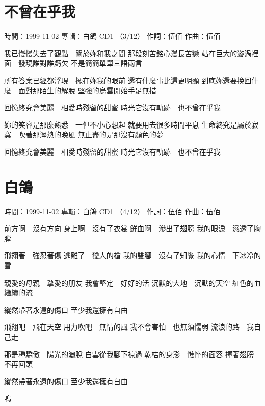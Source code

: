 \documentclass[UTF8,a4paper,oneside,twocolumn,12pt]{ctexbook}
\newcommand{\infopair}[2]{\textbullet #1：#2}
\newcommand{\zc}[1][伍佰]{\infopair{作詞}{#1}}
\newcommand{\zq}[1][伍佰]{\infopair{作曲}{#1}}
\newcommand{\zj}[1]{\infopair{專輯}{#1}}
\newcommand{\sj}[1]{\infopair{時間}{#1}}
\newenvironment{info}{\begin{flushleft}\kaishu
	}
	{\end{flushleft}\normalsize\yahei\par}
\newenvironment{lyric}{
	}
{}
\begin{document}
\section{不曾在乎我}
\begin{info}
	\sj{1999-11-02}
	\zj{白鴿 CD1 （3/12）}
	\zc
	\zq
\end{info}
\begin{lyric}
	我已慢慢失去了觀點　關於妳和我之間
	那段刻苦銘心漫長苦戀
	站在巨大的漩渦裡面　發現誰對誰虧欠
	不是簡簡單單三語兩言

	所有答案已經都浮現　擺在妳我的眼前
	還有什麼事比這更明顯
	到底妳還要挽回什麼　面對那陌生的解脫
	堅強的烏雲開始手足無措

	回憶終究會美麗　相愛時殘留的甜蜜
	時光它沒有軌跡　也不曾在乎我

	妳的笑容是那麼熟悉　一但不小心想起
	就要用去很多時間平息
	生命終究是屬於寂寞　吹著那溼熱的晚風
	無止盡的是那沒有顏色的夢

	回憶終究會美麗　相愛時殘留的甜蜜
	時光它沒有軌跡　也不曾在乎我
\end{lyric}

\section{白鴿}
\begin{info}
	\sj{1999-11-02}
	\zj{白鴿 CD1 （4/12）}
	\zc
	\zq
\end{info}
\begin{lyric}
	前方啊　沒有方向
	身上啊　沒有了衣裳
	鮮血啊　滲出了翅膀
	我的眼淚　濕透了胸膛

	飛翔著　強忍著傷
	逃離了　獵人的槍
	我的雙腳　沒有了知覺
	我的心情　下冰冷的雪

	親愛的母親　摯愛的朋友
	我會堅定　好好的活
	沉默的大地　沉默的天空
	紅色的血　繼續的流

	縱然帶著永遠的傷口
	至少我還擁有自由

	飛翔吧　飛在天空
	用力吹吧　無情的風
	我不會害怕　也無須懦弱
	流浪的路　我自己走

	那是種驕傲　陽光的灑脫
	白雲從我腳下掠過
	乾枯的身影　憔悴的面容
	揮著翅膀　不再回頭

	縱然帶著永遠的傷口
	至少我還擁有自由

	嗚————
\end{lyric}
\end{document}
